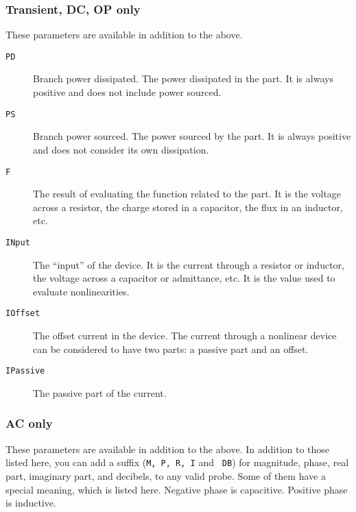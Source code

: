 \subsubsection{Transient, DC, OP only}

These parameters are available in addition to the above.

\begin{description}

\item[{\tt PD}] Branch power dissipated.  The power dissipated in the 
part.  It is always positive and does not include power sourced.

\item[{\tt PS}] Branch power sourced.  The power sourced by the part.  
It is always positive and does not consider its own dissipation.

\item[{\tt F}] The result of evaluating the function related to the 
part.  It is the voltage across a resistor, the charge stored in a 
capacitor, the flux in an inductor, etc.

\item[{\tt INput}] The ``input'' of the device.  It is the current
through a resistor or inductor, the voltage across a capacitor or
admittance, etc.  It is the value used to evaluate nonlinearities.

\item[{\tt IOffset}] The offset current in the device.  The current
through a nonlinear device can be considered to have two parts: a
passive part and an offset.

\item[{\tt IPassive}] The passive part of the current.

\end{description}
\subsubsection{AC only}

These parameters are available in addition to the above.  In addition
to those listed here, you can add a suffix ({\tt M, P, R, I} and {\tt
DB}) for magnitude, phase, real part, imaginary part, and decibels, to 
any valid probe.  Some of them have a special meaning, which is listed 
here.  Negative phase is capacitive.  Positive phase is inductive.

